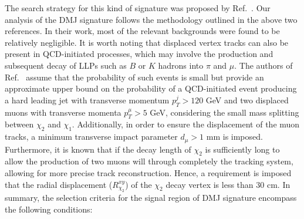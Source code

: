 \documentclass[preprint, superscriptaddress,amsmath, nofootinbib]{revtex4-1}
\begin{document}
The search strategy for this kind of signature was proposed by Ref.~\cite{Izaguirre:2015zva,Berlin:2018jbm}.
Our analysis of the DMJ signature follows the methodology outlined in the above two references. In their work, most of the relevant backgrounds were found to be relatively negligible. It is worth noting that displaced vertex tracks can also be present in QCD-initiated processes, which may involve the production and subsequent decay of LLPs such as $B$ or $K$ hadrons into $\pi$ and $\mu$. The authors of Ref.~\cite{Izaguirre:2015zva} assume that the probability of such events is small but provide an approximate upper bound on the probability of a QCD-initiated event producing a hard leading jet with transverse momentum $p^j_T > 120$ GeV and two displaced muons with transverse momenta $p^{\mu}_T > 5$ GeV, considering the small mass splitting between $\chi_2$ and $\chi_1$. Additionally, in order to ensure the displacement of the muon tracks, a minimum transverse impact parameter $d_\mu > 1$ mm is imposed. Furthermore, it is known that if the decay length of $\chi_2$ is sufficiently long to allow the production of two muons will through completely the tracking system, allowing for more precise track reconstruction. Hence, a requirement is imposed that the radial displacement ($R_{\chi_2}^{xy}$) of the $\chi_2$ decay vertex is less than $30$ cm. In summary, the selection criteria for the signal region of DMJ signature encompass the following conditions: 
\end{document}
